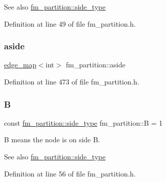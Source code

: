 \begin{DoxySeeAlso}{See also}
\mbox{\hyperlink{classfm__partition_a7cdff1bea3740a287387e8408e16ca79}{fm\+\_\+partition\+::side\+\_\+type}} 
\end{DoxySeeAlso}


Definition at line 49 of file fm\+\_\+partition.\+h.

\mbox{\label{classfm__partition_a14b0aa9a91a6e7fa3035669cf5056275}} 
\subsubsection{\texorpdfstring{aside}{aside}}
{\footnotesize\ttfamily \mbox{\hyperlink{classedge__map}{edge\+\_\+map}}$<$int$>$ fm\+\_\+partition\+::aside\hspace{0.3cm}{\ttfamily [protected]}}



Definition at line 473 of file fm\+\_\+partition.\+h.

\mbox{\label{classfm__partition_a42515c44eecb7ba3e2ec549a877ef238}} 
\subsubsection{\texorpdfstring{B}{B}}
{\footnotesize\ttfamily const \mbox{\hyperlink{classfm__partition_a7cdff1bea3740a287387e8408e16ca79}{fm\+\_\+partition\+::side\+\_\+type}} fm\+\_\+partition\+::B = 1\hspace{0.3cm}{\ttfamily [static]}}

{\ttfamily B} means the node is on side B.

\begin{DoxySeeAlso}{See also}
\mbox{\hyperlink{classfm__partition_a7cdff1bea3740a287387e8408e16ca79}{fm\+\_\+partition\+::side\+\_\+type}} 
\end{DoxySeeAlso}


Definition at line 56 of file fm\+\_\+partition.\+h.

\mbox{\label{classfm__partition_aa75765887173fb06b076b6cae12d4e66}} 
